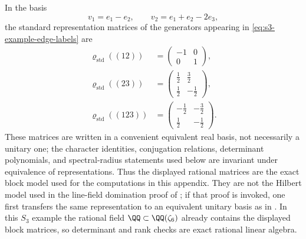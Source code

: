 In the basis
\[
  v_1=e_1-e_2,\qquad v_2=e_1+e_2-2e_3,
\]
the standard representation matrices of the generators appearing in
\eqref{eq:s3-example-edge-labels} are
\begin{equation}\label{eq:s3-standard-representation-matrices}
\begin{aligned}
  \varrho_{\mathrm{std}}((12))
    &=
    \begin{pmatrix}
      -1 & 0 \\
      0 & 1
    \end{pmatrix}, \\
  \varrho_{\mathrm{std}}((23))
    &=
    \begin{pmatrix}
      \frac12 & \frac32 \\
      \frac12 & -\frac12
    \end{pmatrix}, \\
  \varrho_{\mathrm{std}}((123))
    &=
    \begin{pmatrix}
      -\frac12 & -\frac32 \\
      \frac12 & -\frac12
    \end{pmatrix}.
\end{aligned}
\end{equation}
These matrices are written in a convenient equivalent real basis, not
necessarily a unitary one; the character identities, conjugation
relations, determinant polynomials, and spectral-radius statements used
below are invariant under equivalence of representations.  Thus the
displayed rational matrices are the exact block model used for the
computations in this appendix.  They are not the Hilbert model used in the
line-field domination proof of ; if that proof is
invoked, one first transfers the same representation to an equivalent
unitary basis as in .  In this
\(S_3\) example the rational field \(\QQ\subset\QQ(\zeta_6)\) already
contains the displayed block matrices, so determinant and rank checks are
exact rational linear algebra.

